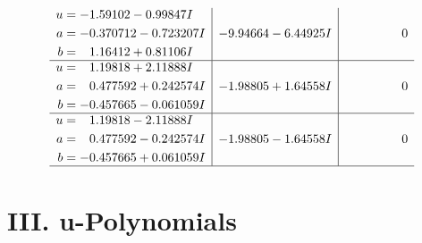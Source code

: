 \documentclass[1p]{elsarticle_modified}
\theoremstyle{definition}
\begin{document}
$$\begin{array}{c|c|c}
\begin{aligned}
u &= -1.59102 - 0.99847 I \\
a &= -0.370712 - 0.723207 I \\
b &= \phantom{-}1.16412 + 0.81106 I\end{aligned}
 & -9.94664 - 6.44925 I & \phantom{-0.000000 } 0 \\ \hline\begin{aligned}
u &= \phantom{-}1.19818 + 2.11888 I \\
a &= \phantom{-}0.477592 + 0.242574 I \\
b &= -0.457665 - 0.061059 I\end{aligned}
 & -1.98805 + 1.64558 I & \phantom{-0.000000 } 0 \\ \hline\begin{aligned}
u &= \phantom{-}1.19818 - 2.11888 I \\
a &= \phantom{-}0.477592 - 0.242574 I \\
b &= -0.457665 + 0.061059 I\end{aligned}
 & -1.98805 - 1.64558 I & \phantom{-0.000000 } 0\\
 \hline 
 \end{array}$$\newpage
\newpage\renewcommand{\arraystretch}{1}
\centering \section*{ III. u-Polynomials}
\end{document}
